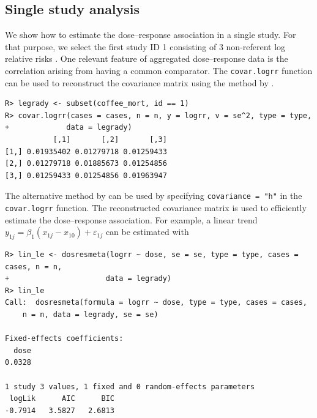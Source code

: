 \documentclass[11pt,a4paper,twoside,openany]{book}\usepackage{knitr}
\begin{document}
{\subsection{Single study analysis}

\noindent We show how to estimate the dose--response association in a single study. For that purpose, we select the first study ID 1 consisting of 3 non-referent log relative risks \citep{legrady1987coffee}. One relevant feature of aggregated dose--response data is the correlation arising from having a common comparator. The \texttt{covar.logrr} function can be used to reconstruct the covariance matrix using the method by \cite{greenland1992methods}.

\begin{knitrout}\footnotesize
{}\color{fgcolor}\begin{kframe}
\begin{verbatim}
R> legrady <- subset(coffee_mort, id == 1)
R> covar.logrr(cases = cases, n = n, y = logrr, v = se^2, type = type, 
+             data = legrady)
           [,1]       [,2]       [,3]
[1,] 0.01935402 0.01279718 0.01259433
[2,] 0.01279718 0.01885673 0.01254856
[3,] 0.01259433 0.01254856 0.01963947
\end{verbatim}
\end{kframe}
\end{knitrout}

\noindent The alternative method by \cite{hamling2008facilitating} can be used by specifying \texttt{covariance = "h"} in the \texttt{covar.logrr} function. The reconstructed covariance matrix is used to efficiently estimate the dose--response association. For example, a linear trend $y_{1j} = \beta_1 (x_{1j} - x_{10}) + \varepsilon_{1j}$ can be estimated with

\begin{knitrout}\footnotesize
{}\color{fgcolor}\begin{kframe}
\begin{verbatim}
R> lin_le <- dosresmeta(logrr ~ dose, se = se, type = type, cases = cases, n = n, 
+                      data = legrady)
R> lin_le
Call:  dosresmeta(formula = logrr ~ dose, type = type, cases = cases, 
    n = n, data = legrady, se = se)

Fixed-effects coefficients:
  dose  
0.0328  

1 study 3 values, 1 fixed and 0 random-effects parameters
 logLik      AIC      BIC  
-0.7914   3.5827   2.6813  
\end{verbatim}
\end{kframe}
\end{knitrout}


}
\end{document}
